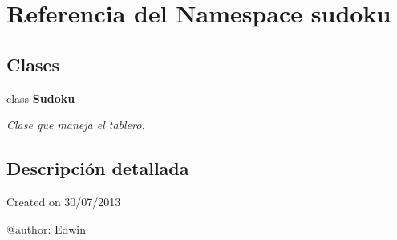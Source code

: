 \section{Referencia del Namespace sudoku}
\label{namespacesudoku}
\subsection*{Clases}
\begin{DoxyCompactItemize}
\item 
class {\bf Sudoku}
\begin{DoxyCompactList}\small\item\em Clase que maneja el tablero. \end{DoxyCompactList}\end{DoxyCompactItemize}


\subsection{Descripción detallada}
\begin{DoxyVerb}Created on 30/07/2013

@author: Edwin
\end{DoxyVerb}
 